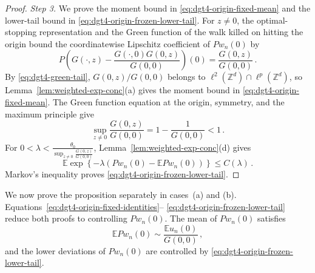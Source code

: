 \documentclass[11pt]{amsart}
\theoremstyle{plain}
\theoremstyle{definition}
\newcommand{\Z}{\mathbb{Z}}
\newcommand{\E}{\mathbb{E}}
\begin{document}
\begin{proof}
	\noindent\emph{Step 3.} We prove the moment bound in
	\eqref{eq:dgt4-origin-fixed-mean} and the lower-tail bound in
	\eqref{eq:dgt4-origin-frozen-lower-tail}.
	For $z\ne0$, the optimal-stopping representation and the Green function of
	the walk killed on hitting the origin bound the coordinatewise Lipschitz
	coefficient of $Pw_n(0)$ by
	\[
	 P\left(
	 G(\mathord\cdot,z)
	 -\frac{G(\mathord\cdot,0)G(0,z)}{G(0,0)}
	 \right)(0)
	 =\frac{G(0,z)}{G(0,0)}\, .
	\]
	By \eqref{eq:dgt4-green-tail}, $G(0,z)/G(0,0)$ belongs to
	$\ell^2(\Z^d)\cap\ell^p(\Z^d)$, so Lemma~\ref{lem:weighted-exp-conc}\textup{(a)}
	gives the moment bound in \eqref{eq:dgt4-origin-fixed-mean}. The Green
	function equation at the origin, symmetry, and the maximum principle give
	\[
		\sup_{z\ne0}\frac{G(0,z)}{G(0,0)}
		=1-\frac1{G(0,0)}<1\, .
	\]
	For $0<\lambda<\displaystyle\frac{\theta_0}{\sup_{z\ne0}\frac{G(0,z)}{G(0,0)}}$,
	Lemma~\ref{lem:weighted-exp-conc}\textup{(d)} gives
	\[
		\E\exp\left\{
		-\lambda(Pw_n(0)-\E Pw_n(0))
		\right\}
		\leq C(\lambda)
	\, .
	\]
	Markov's inequality proves \eqref{eq:dgt4-origin-frozen-lower-tail}.
\end{proof}
	We now prove the proposition separately in cases~\textup{(a)} and
	\textup{(b)}. Equations~\eqref{eq:dgt4-origin-fixed-identities}--
	\eqref{eq:dgt4-origin-frozen-lower-tail} reduce both proofs to controlling
	$Pw_n(0)$. The mean of $Pw_n(0)$ satisfies
	\[
		\E Pw_n(0)\sim\frac{\E u_n(0)}{G(0,0)}\, ,
	\]
	and the lower deviations of $Pw_n(0)$ are controlled by
	\eqref{eq:dgt4-origin-frozen-lower-tail}.
\end{document}
